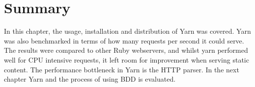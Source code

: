 \section{Summary}
In this chapter, the usage, installation and distribution of Yarn was covered.
Yarn was also benchmarked in terms of how many requests per second it could
serve. The results were compared to other Ruby webservers, and whilst yarn
performed well for CPU intensive requests, it left room for improvement when
serving static content. The performance bottleneck in Yarn is the HTTP parser. In the next chapter Yarn and the process of using BDD
is evaluated.
